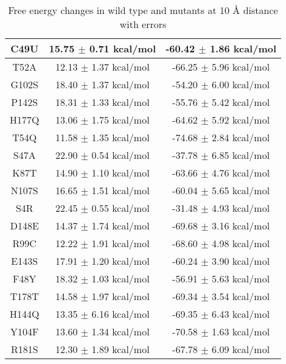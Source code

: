 \documentclass{article}
\begin{document}
\begin{table}[ht]
    \centering
    \begin{tabular}{|c|c|c|}
    \hline
    C49U & 15.75 $\pm$ 0.71 kcal/mol & -60.42 $\pm$ 1.86 kcal/mol \\
    \hline
    T52A & 12.13 $\pm$ 1.37 kcal/mol & -66.25 $\pm$ 5.96 kcal/mol \\
    \hline
    G102S & 18.40 $\pm$ 1.37 kcal/mol & -54.20 $\pm$ 6.00 kcal/mol \\
    \hline
    P142S & 18.31 $\pm$ 1.33 kcal/mol & -55.76 $\pm$ 5.42 kcal/mol \\
    \hline
    H177Q & 13.06 $\pm$ 1.75 kcal/mol & -64.62 $\pm$ 5.92 kcal/mol \\
    \hline
    T54Q & 11.58 $\pm$ 1.35 kcal/mol & -74.68 $\pm$ 2.84 kcal/mol \\
    \hline
    S47A & 22.90 $\pm$ 0.54 kcal/mol & -37.78 $\pm$ 6.85 kcal/mol \\
    \hline
    K87T & 14.90 $\pm$ 1.10 kcal/mol & -63.66 $\pm$ 4.76 kcal/mol \\
    \hline
    N107S & 16.65 $\pm$ 1.51 kcal/mol & -60.04 $\pm$ 5.65 kcal/mol \\
    \hline
    S4R & 22.45 $\pm$ 0.55 kcal/mol & -31.48 $\pm$ 4.93 kcal/mol \\
    \hline
    D148E & 14.37 $\pm$ 1.74 kcal/mol & -69.68 $\pm$ 3.16 kcal/mol \\
    \hline
    R99C & 12.22 $\pm$ 1.91 kcal/mol & -68.60 $\pm$ 4.98 kcal/mol \\
    \hline
    E143S & 17.91 $\pm$ 1.20 kcal/mol & -60.24 $\pm$ 3.90 kcal/mol \\
    \hline
    F48Y & 18.32 $\pm$ 1.03 kcal/mol & -56.91 $\pm$ 5.63 kcal/mol \\
    \hline
    T178T & 14.58 $\pm$ 1.97 kcal/mol & -69.34 $\pm$ 3.54 kcal/mol \\
    \hline
    H144Q & 13.35 $\pm$ 6.16 kcal/mol & -69.35 $\pm$ 6.43 kcal/mol \\
    \hline
    Y104F & 13.60 $\pm$ 1.34 kcal/mol & -70.58 $\pm$ 1.63 kcal/mol \\
    \hline
    R181S & 12.30 $\pm$ 1.89 kcal/mol & -67.78 $\pm$ 6.09 kcal/mol \\
    \hline
    \end{tabular}
    \caption{Free energy changes in wild type and mutants at 10 Å distance with errors}
\end{table}
\end{document}
